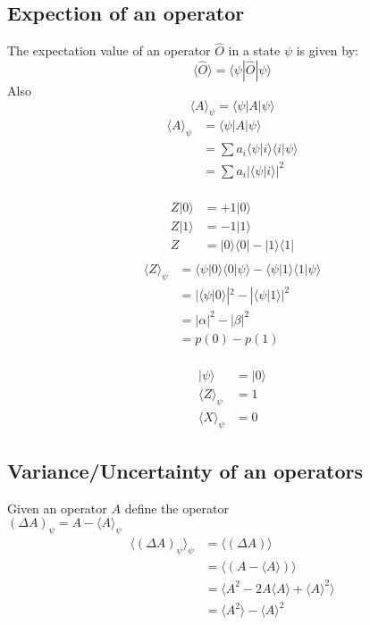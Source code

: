 \documentclass[answers,12pt,addpoints]{exam}
\begin{document}
\subsection{Expection of an operator}
The expectation value of an operator $\hat{O}$ in a state $\psi$ is given by:
\[
\langle \hat{O} \rangle = \langle \psi | \hat{O} | \psi \rangle
\]
Also 
$$ \langle A \rangle_{\psi} = \langle \psi | A | \psi \rangle$$
\begin{align*}
    \langle A \rangle_{\psi} &= \langle \psi | A | \psi \rangle \\
    &= \sum a_i \langle \psi | i \rangle \langle i | \psi \rangle \\
    &= \sum a_i | \langle \psi | i  \rangle |^2 \\
\end{align*} 
\begin{example}
    \begin{align*}
        Z|0\rangle &= + 1 |0\rangle \\
        Z|1\rangle &= - 1 |1\rangle \\
        Z &= |0\rangle \langle 0| - |1\rangle \langle 1| \\
    \end{align*}
    \begin{align*}
        \langle Z \rangle_\psi &= \langle \psi | 0 \rangle \langle 0 | \psi \rangle - \langle \psi | 1 \rangle \langle 1 | \psi \rangle \\
        &= | \langle \psi | 0 \rangle |^2 - | \langle \psi | 1 \rangle |^2 \\
        &= |\alpha|^2 - |\beta|^2 \\
        &= p(0) - p(1) \\
    \end{align*}
\end{example}
\begin{example}
    \begin{align*}
        |\psi \rangle &= |0\rangle\\
        \langle Z \rangle_\psi &= 1 \\
        \langle X \rangle_\psi &= 0 
    \end{align*}
\end{example}
\subsection{Variance/Uncertainty of an operators}
Given an operator $A$ define the operator \\
$ \left( \Delta A \right)_{\psi} = A - \langle A \rangle_{\psi}$
\begin{align*}
    \langle \left( \Delta A \right)_{\psi} \rangle_{\psi} &= \langle \left( \Delta A \right) \rangle \\
    &= \langle \left( A - \langle A \rangle \right) \rangle \\
    &= \langle A^2 - 2A \langle A \rangle + \langle A \rangle^2 \rangle \\
    &= \langle A^2 \rangle - \langle A \rangle^2 
\end{align*}
\end{document}
